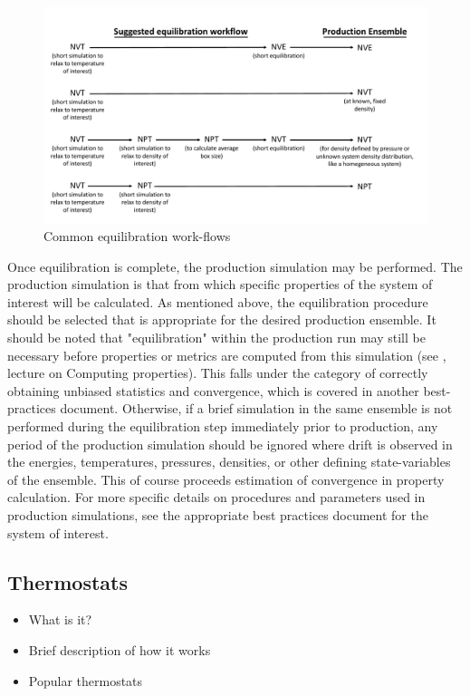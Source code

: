 \documentclass[9pt,bestpractices]{livecoms}
\begin{document}
\begin{figure}[h]
\centering
\includegraphics[width=\linewidth]{Equilibration_Workflow.pdf}
\caption{Common equilibration work-flows}
\label{eqworkflow}
\end{figure}

Once equilibration is complete, the production simulation may be performed. 
The production simulation is that from which specific properties of the system of interest will be calculated. 
As mentioned above, the equilibration procedure should be selected that is appropriate for the desired production ensemble. 
It should be noted that "equilibration" within the production run may still be necessary before properties or metrics are computed from this simulation (see \citet{ShellNotes}, lecture on Computing properties).
This falls under the category of correctly obtaining unbiased statistics and convergence, which is covered in another best-practices document. %
Otherwise, if a brief simulation in the same ensemble is not performed during the equilibration step immediately prior to production, any period of the production simulation should be ignored where drift is observed in the energies, temperatures, pressures, densities, or other defining state-variables of the ensemble. 
This of course proceeds estimation of convergence in property calculation.
For more specific details on procedures and parameters used in production simulations, see the appropriate best practices document for the system of interest.

\subsection{Thermostats}
\begin{itemize}
\item What is it?
\item Brief description of how it works
\item Popular thermostats
\end{itemize}
\end{document}
